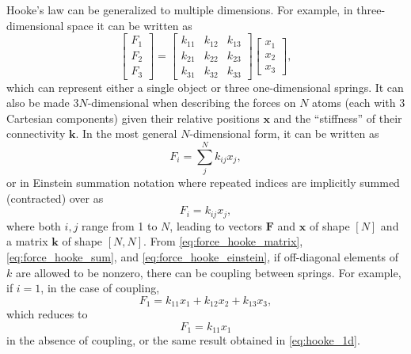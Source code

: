 \documentclass[%
class = book,%
crop = false,%
float = true,%
multi = true,%
preview = false,%
]{standalone}
\begin{document}
Hooke's law can be generalized to multiple dimensions. For example, in three-dimensional space it can be written as
\begin{equation}
  \label{eq:force_hooke_matrix}
  \begin{bmatrix}
    F_{1} \\ F_{2} \\ F_{3}
  \end{bmatrix}
  =
  \begin{bmatrix}
    k_{11} & k_{12} & k_{13} \\
    k_{21} & k_{22} & k_{23} \\
    k_{31} & k_{32} & k_{33}
  \end{bmatrix}
  \begin{bmatrix}
    x_{1} \\ x_{2} \\ x_{3}
  \end{bmatrix},
\end{equation}
which can represent either a single object or three one-dimensional springs. It can also be made \(3N\)-dimensional when describing the forces on \(N\) atoms (each with 3 Cartesian components) given their relative positions \(\mathbf{x}\) and the ``stiffness'' of their connectivity \(\mathbf{k}\). In the most general \(N\)-dimensional form, it can be written as
\begin{equation}
  \label{eq:force_hooke_sum}
  F_{i} = \sum_{j}^{N} k_{ij} x_{j},
\end{equation}
or in Einstein summation notation where repeated indices are implicitly summed (contracted) over as
\begin{equation}
  \label{eq:force_hooke_einstein}
  F_{i} = k_{ij} x_{j},
\end{equation}
where both \(i,j\) range from 1 to \(N\), leading to vectors \(\mathbf{F}\) and \(\mathbf{x}\) of shape \([N]\) and a matrix \(\mathbf{k}\) of shape \([N,N]\). From \eqref{eq:force_hooke_matrix}, \eqref{eq:force_hooke_sum}, and \eqref{eq:force_hooke_einstein}, if off-diagonal elements of \(k\) are allowed to be nonzero, there can be coupling between springs. For example, if \(i = 1\), in the case of coupling,
\begin{equation}
  \label{eq:force_hooke_example}
  F_{1} = k_{11}x_{1} + k_{12}x_{2} + k_{13}x_{3},
\end{equation}
which reduces to
\begin{equation}
  \label{eq:force_hooke_example_nocoupling}
  F_{1} = k_{11}x_{1}
\end{equation}
in the absence of coupling, or the same result obtained in \eqref{eq:hooke_1d}.
\end{document}

